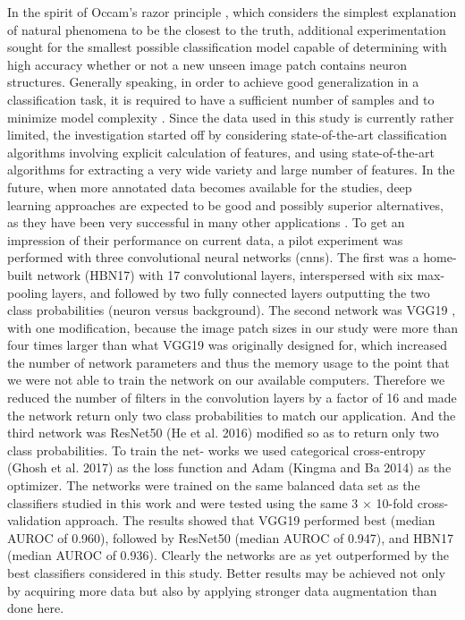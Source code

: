 In the spirit of Occam's razor principle \cite{iacca2012ockham, hong2013particle, ebrahimpour2017occam}, which considers the simplest explanation of natural phenomena to be the closest to the truth, additional experimentation sought for the smallest possible classification model capable of determining with high accuracy whether or not a new unseen image patch contains neuron structures. Generally speaking, in order to achieve good generalization in a classification task, it is required to have a sufficient number of samples and to minimize model complexity \cite{gupta2017sparse}. Since the data used in this study is currently rather limited, the investigation started off by considering state-of-the-art classification algorithms involving explicit calculation of features, and using state-of-the-art algorithms for extracting a very wide variety and large number of features. In the future, when more annotated data becomes available for the studies, deep learning approaches are expected to be good and possibly superior alternatives, as they have been very successful in many other applications \cite{lecun2015deep, bianchini2014complexity, greenspan2016guest, tajbakhsh2016convolutional, shaikhina2017handling, litjens2017survey, shen2017deep}. To get an impression of their performance on current data, a pilot experiment was performed with three convolutional neural networks (\gls{cnn}s). The first was a home-built network (HBN17) with 17 convolutional layers, interspersed with six max-pooling layers, and followed by two fully connected layers outputting the two class probabilities (neuron versus background). The second network was VGG19 \cite{simonyan2014very}, with one modification, because the image patch sizes in our study were more than four times larger than what VGG19 was originally designed for, which increased the number of network parameters and thus the memory usage to the point that we were not able to train the network on our available computers. Therefore we reduced the number of filters in the convolution layers by a factor of 16 and made the network return only two class probabilities to match our application. And the third network was ResNet50 (He et al. 2016) modified so as to return only two class probabilities. To train the net- works we used categorical cross-entropy (Ghosh et al. 2017) as the loss function and Adam (Kingma and Ba 2014) as the optimizer. The networks were trained on the same balanced data set as the classifiers studied in this work and were tested using the same 3 × 10-fold cross-validation approach. The results showed that VGG19 performed best (median AUROC of 0.960), followed by ResNet50 (median AUROC of 0.947), and HBN17 (median AUROC of 0.936). Clearly the networks are as yet outperformed by the best classifiers considered in this study. Better results may be achieved not only by acquiring more data but also by applying stronger data augmentation than done here.

